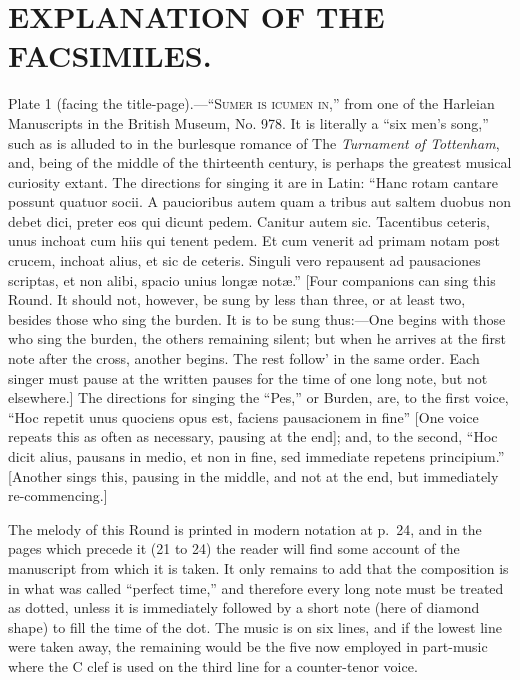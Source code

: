 \renewcommand\versoheader{explanation of the facsimiles.}
\renewcommand\rectoheader{explanation of the facsimiles.}

\chapter{EXPLANATION OF THE FACSIMILES.}

\vfill

\quad Plate 1 (facing the title-page).—“\textsc{Sumer is icumen in},” from one of the Harleian 
Manuscripts in the British Museum, No. 978. It is literally a “six men’s song,”
such as is alluded to in the burlesque romance of The \textit{Turnament of Tottenham},
and, being of the middle of the thirteenth century, is perhaps the greatest musical
curiosity extant. The directions for singing it are in Latin: “Hanc rotam cantare
possunt quatuor socii. A paucioribus autem quam a tribus aut saltem duobus non
debet dici, preter eos qui dicunt pedem. Canitur autem sic. Tacentibus ceteris, unus
inchoat cum hiis qui tenent pedem. Et cum venerit ad primam notam post crucem,
inchoat alius, et sic de ceteris. Singuli vero repausent ad pausaciones scriptas, et non
alibi, spacio unius longæ notæ.” [Four companions can sing this Round. It should
not, however, be sung by less than three, or at least two, besides those who sing the
burden. It is to be sung thus:—One begins with those who sing the burden, the
others remaining silent; but when he arrives at the first note after the cross, another
begins. The rest follow' in the same order. Each singer must pause at the written
pauses for the time of one long note, but not elsewhere.] The directions for singing
the “Pes,” or Burden, are, to the first voice, “Hoc repetit unus quociens opus est,
faciens pausacionem in fine” [One voice repeats this as often as necessary, pausing at
the end]; and, to the second, “Hoc dicit alius, pausans in medio, et non in fine, sed
immediate repetens principium.” [Another sings this, pausing in the middle, and
not at the end, but immediately re-commencing.]

The melody of this Round is printed in modern notation at p.~24, and in the pages
which precede it (21 to 24) the reader will find some account of the manuscript from
which it is taken. It only remains to add that the composition is in what was called
“perfect time,” and therefore every long note must be treated as dotted, unless it is
immediately followed by a short note (here of diamond shape) to fill the time of the
dot. The music is on six lines, and if the lowest line were taken away, the remaining
would be the five now employed in part-music where the C clef is used on the third
line for a counter-tenor voice.

